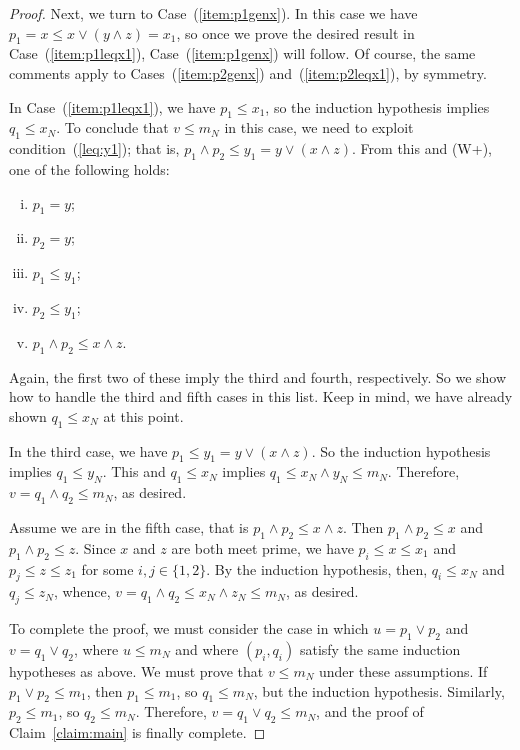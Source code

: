 \begin{proof}
  Next, we turn to Case~(\ref{item:p1genx}). In this case we have
  $p_1 = x \leq x \vee (y \wedge z) = x_1$, so once we prove the desired result in Case~(\ref{item:p1leqx1}), Case~(\ref{item:p1genx}) will follow.
  Of course, the same comments apply to Cases~(\ref{item:p2genx}) and~(\ref{item:p2leqx1}), by symmetry. 

  In Case~(\ref{item:p1leqx1}), we have
  $p_1\leq x_1$, so the induction hypothesis implies $q_1 \leq x_N$. To 
  conclude that $v \leq m_N$ in this case, we need to exploit condition~(\ref{leq:y1}); that is, 
  $p_1\wedge p_2 \leq y_1 = y \vee (x \wedge z)$. From this and (W+),
  one of the following holds:
  \begin{enumerate}[(i)]
    \item   $p_1=y$;
    \item   $p_2=y$;
    \item   $p_1\leq y_1$;
    \item   $p_2 \leq y_1$;
    \item   $p_1\wedge p_2 \leq x \wedge z$.  
  \end{enumerate}
  Again, the first two of these imply the third and fourth, respectively.
  So we show how to handle the third and fifth cases in this list.
  Keep in mind, we have already shown $q_1 \leq x_N$ at this point.
  
  In the third case, we have $p_1\leq y_1 = y \vee (x\wedge z)$. So the induction hypothesis implies $q_1 \leq y_N$. This and $q_1 \leq x_N$ implies 
  $q_1\leq x_N \wedge y_N \leq m_N$.  Therefore, $v = q_1\wedge q_2 \leq m_N$, as desired.

  Assume we are in the fifth case, that is $p_1\wedge p_2 \leq x \wedge z$.
  Then $p_1\wedge p_2 \leq x$ and $p_1\wedge p_2 \leq z$. Since $x$ and $z$ are both meet prime, we have $p_i\leq x\leq x_1$ and $p_j\leq z\leq z_1$ for some $i, j\in \{1,2\}$.  By the induction hypothesis, then, $q_i \leq x_N$ and $q_j\leq z_N$, whence, $v = q_1 \wedge q_2 \leq x_N \wedge z_N \leq m_N$, 
  as desired.
  
  To complete the proof, we must consider the case in which
  $u  = p_1 \vee p_2$ and 
  $v = q_1 \vee q_2$, where $u \leq m_N$ and where $(p_i,q_i)$ satisfy the same induction hypotheses as above. We must prove that $v  \leq m_N$ under these assumptions.
  If $p_1 \vee p_2 \leq m_1$, then $p_1 \leq m_1$, so $q_1\leq m_N$, but the induction hypothesis.  Similarly, $p_2\leq m_1$, so $q_2\leq m_N$.  Therefore, $v = q_1\vee q_2 \leq m_N$, and the proof of Claim~\ref{claim:main} is finally complete.
\end{proof}

